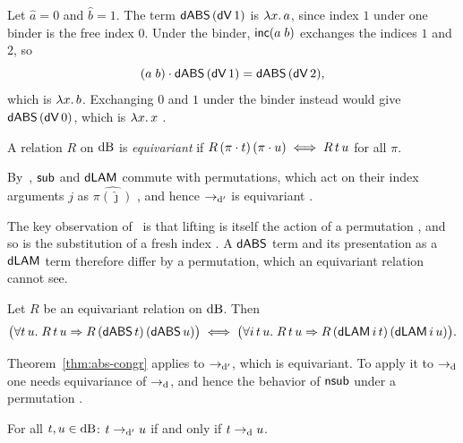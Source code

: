 \begin{example}
\label{ex:dpm}
Let $\hat{a} = 0$ and $\hat{b} = 1$. The term $\mathsf{dABS}\, (\mathsf{dV}\, 1)$ is
$\lambda x.\,a$, since index $1$ under one binder is the free index $0$.
Under the binder, $\mathsf{inc}(a\;b)$ exchanges the indices $1$ and $2$,
so
\[
  (a\;b) \cdot \mathsf{dABS}\, (\mathsf{dV}\, 1) = \mathsf{dABS}\, (\mathsf{dV}\, 2),
\]
which is $\lambda x.\,b$. Exchanging $0$ and $1$ under the binder
instead would give $\mathsf{dABS}\, (\mathsf{dV}\, 0)$, which is $\lambda x.\,x$
.
\end{example}

A relation $R$ on $\mathrm{dB}$ is \emph{equivariant} if
$R\,(\pi \cdot t)\,(\pi \cdot u) \iff R\, t\, u$ for all $\pi$.

By~\cite[Theorem~10]{norrish2007a}, $\mathsf{sub}$ and $\mathsf{dLAM}$ commute
with permutations, which act on their index arguments $j$ as
$\widehat{\pi(\hat{\jmath})}$
%
, and hence
$\to_{\mathrm{d}'}$ is equivariant
.

The key observation of~\cite{norrish2007a} is that lifting is itself
the action of a permutation
\cite[Lemma~14]{norrish2007a}, and so is the substitution of a fresh
index
.
A $\mathsf{dABS}$ term and its presentation as a $\mathsf{dLAM}$ term therefore
differ by a permutation, which an equivariant relation cannot see.

\begin{theorem}
\label{thm:abs-congr}
Let $R$ be an equivariant relation on $\mathrm{dB}$. Then
\[
  \bigl(\forall t\, u.\; R\, t\, u \Rightarrow
     R\,(\mathsf{dABS}\, t)\,(\mathsf{dABS}\, u)\bigr)
  \iff
  \bigl(\forall i\, t\, u.\; R\, t\, u \Rightarrow
     R\,(\mathsf{dLAM}\, i\, t)\,(\mathsf{dLAM}\, i\, u)\bigr).
\]
\end{theorem}

Theorem~\ref{thm:abs-congr} applies to $\to_{\mathrm{d}'}$, which is equivariant. To apply it to $\to_{\mathrm{d}}$ one needs
equivariance of $\to_{\mathrm{d}}$, and hence the behavior of $\mathsf{nsub}$ under a
permutation
\cite[Lemma~17]{norrish2007a}.

\begin{theorem}
\label{thm:dbeta-coincide}
For all $t, u \in \mathrm{dB}$: $t \to_{\mathrm{d}'} u$ if and only if $t \to_{\mathrm{d}} u$.
\end{theorem}

